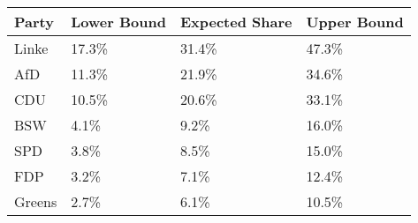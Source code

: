 \begin{tabular}{llll}
  \hline
Party & Lower Bound & Expected Share & Upper Bound \\ 
  \hline
Linke & 17.3\% & 31.4\% & 47.3\% \\ 
  AfD & 11.3\% & 21.9\% & 34.6\% \\ 
  CDU & 10.5\% & 20.6\% & 33.1\% \\ 
  BSW & 4.1\% & 9.2\% & 16.0\% \\ 
  SPD & 3.8\% & 8.5\% & 15.0\% \\ 
  FDP & 3.2\% & 7.1\% & 12.4\% \\ 
  Greens & 2.7\% & 6.1\% & 10.5\% \\ 
   \hline
\end{tabular}
